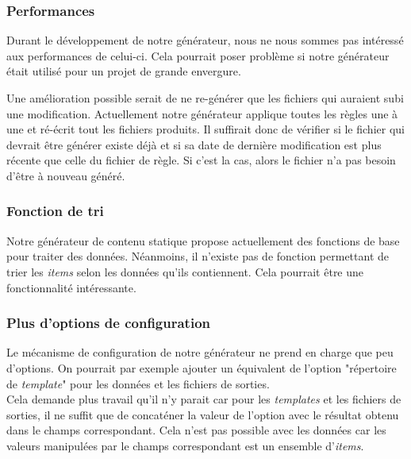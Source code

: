 		\subsubsection*{Performances}
		
			Durant le développement de notre générateur, nous ne nous sommes pas intéressé aux performances de celui-ci. Cela pourrait poser problème si notre générateur était utilisé pour un projet de grande envergure.\\
			
			\newpage
			
			Une amélioration possible serait de ne re-générer que les fichiers qui auraient subi une modification. Actuellement notre générateur applique toutes les règles une à une et ré-écrit tout les fichiers produits. Il suffirait donc de vérifier si le fichier qui devrait être générer existe déjà et si sa date de dernière modification est plus récente que celle du fichier de règle. Si c'est la cas, alors le fichier n'a pas besoin d'être à nouveau généré.
		
		\subsubsection*{Fonction de tri}
		
			Notre générateur de contenu statique propose actuellement des fonctions de base pour traiter des données. Néanmoins, il n'existe pas de fonction permettant de trier les \textit{items} selon les données qu'ils contiennent. Cela pourrait être une fonctionnalité intéressante.  
	
		
		\subsubsection*{Plus d'options de configuration}
		
			Le mécanisme de configuration de notre générateur ne prend en charge que peu d'options. On pourrait par exemple ajouter un équivalent de l'option "répertoire de \textit{template}" pour les données et les fichiers de sorties.\\
			
			Cela demande plus travail qu'il n'y parait car pour les \textit{templates} et les fichiers de sorties, il ne suffit que de concaténer la valeur de l'option avec le résultat obtenu dans le champs correspondant. Cela n'est pas possible avec les données car les valeurs manipulées par le champs correspondant est un ensemble d'\textit{items}.
	
		
		